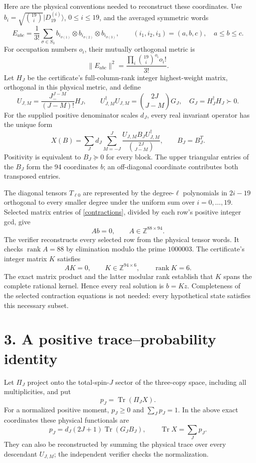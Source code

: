\documentclass[11pt]{article}
\newcommand{\Tr}{\operatorname{Tr}}
\begin{document}
Here are the physical conventions needed to reconstruct these coordinates.
Use $b_i=\sqrt{\binom{19}{i}}|D_{19}^{(i)}\rangle$, $0\le i\le19$, and
the averaged symmetric words
\[
 E_{abc}=\frac1{3!}\sum_{\sigma\in S_3}
 b_{i_{\sigma(1)}}\otimes b_{i_{\sigma(2)}}\otimes b_{i_{\sigma(3)}},
 \qquad (i_1,i_2,i_3)=(a,b,c),\quad a\le b\le c.
\]
For occupation numbers $o_i$, their mutually orthogonal metric is
\[
 \|E_{abc}\|^2=\frac{\prod_i\binom{19}{i}^{o_i}o_i!}{3!}.
\]
Let $H_J$ be the certificate's full-column-rank integer highest-weight
matrix, orthogonal in this physical metric, and define
\[
 U_{J,M}=\frac{J_-^{J-M}}{(J-M)!}H_J,\qquad
 U_{J,M}^{\dagger}U_{J,M}=\binom{2J}{J-M}G_J,
 \quad G_J=H_J^{\dagger}H_J\succ0.
\]
For the supplied positive denominator scales $d_J$, every real invariant
operator has the unique form
\[
 X(B)=\sum_J d_J\sum_{M=-J}^{J}
 \frac{U_{J,M}B_JU_{J,M}^{\dagger}}{\binom{2J}{J-M}},
 \qquad B_J=B_J^T.
\]
Positivity is equivalent to $B_J\succeq0$ for every block. The upper
triangular entries of the $B_J$ form the 94 coordinates $b$; an off-diagonal
coordinate contributes both transposed entries.

The diagonal tensors $T_{\ell0}$ are represented by the degree-$\ell$
polynomials in $2i-19$ orthogonal to every smaller degree under the uniform
sum over $i=0,\ldots,19$. Selected matrix entries of
\eqref{contractions}, divided by each row's positive integer gcd, give
\[
 A b=0,\qquad A\in\mathbb Z^{88\times94}.
\]
The verifier reconstructs every selected row from the physical tensor
words. It checks $\operatorname{rank}A=88$ by elimination modulo the prime
$1000003$. The certificate's integer matrix $K$ satisfies
\[
 AK=0,\qquad K\in\mathbb Z^{94\times6},\qquad
 \operatorname{rank}K=6.
\]
The exact matrix product and the latter modular rank establish that $K$
spans the complete rational kernel. Hence every real solution is $b=Kz$.
Completeness of the selected contraction equations is not needed: every
hypothetical state satisfies this necessary subset.

\section*{3. A positive trace--probability identity}
Let $\Pi_J$ project onto the total-spin-$J$ sector of the three-copy space,
including all multiplicities, and put
\[
 p_J=\Tr(\Pi_JX).
\]
For a normalized positive moment, $p_J\ge0$ and $\sum_Jp_J=1$.
In the above exact coordinates these physical functionals are
\[
 p_J=d_J(2J+1)\Tr(G_JB_J),\qquad \Tr X=\sum_Jp_J.
\]
They can also be reconstructed by summing the physical trace over every
descendant $U_{J,M}$; the independent verifier checks the normalization.
\end{document}
